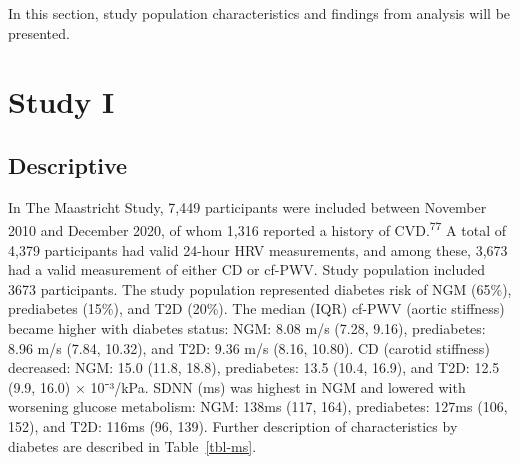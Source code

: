 \documentclass[
  a4paper,
  headsepline=true,
  open=left]{scrbook}
\begin{document}
\clearpage
\null
\thispagestyle{empty}
\clearpage

In this section, study population characteristics and findings from
analysis will be presented.

\hypertarget{study-i}{%
\section{Study I}\label{study-i}}

\hypertarget{descriptive}{%
\subsection{Descriptive}\label{descriptive}}

In The Maastricht Study, 7,449 participants were included between
November 2010 and December 2020, of whom 1,316 reported a history of
CVD.\textsuperscript{77} A total of 4,379 participants had valid 24-hour
HRV measurements, and among these, 3,673 had a valid measurement of
either CD or cf-PWV. Study population included 3673 participants. The
study population represented diabetes risk of NGM (65\%), prediabetes
(15\%), and T2D (20\%). The median (IQR) cf-PWV (aortic stiffness)
became higher with diabetes status: NGM: 8.08 m/s (7.28, 9.16),
prediabetes: 8.96 m/s (7.84, 10.32), and T2D: 9.36 m/s (8.16, 10.80). CD
(carotid stiffness) decreased: NGM: 15.0 (11.8, 18.8), prediabetes: 13.5
(10.4, 16.9), and T2D: 12.5 (9.9, 16.0) × 10⁻³/kPa. SDNN (ms) was
highest in NGM and lowered with worsening glucose metabolism: NGM: 138ms
(117, 164), prediabetes: 127ms (106, 152), and T2D: 116ms (96, 139).
Further description of characteristics by diabetes are described in
Table~\ref{tbl-ms}.

\end{document}
